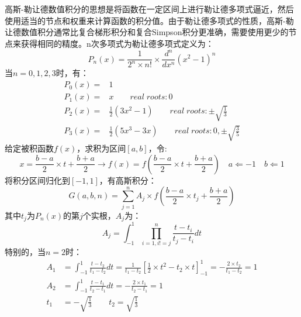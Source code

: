 \documentclass[12pt, onecolumn]{article}
\newcommand\normf{\fangsong}
\begin{document}
	\section{\normf{高斯型求积公式}}
	高斯-勒让德数值积分的思想是将函数在一定区间上进行勒让德多项式逼近，然后使用适当的节点和权重来计算函数的积分值。由于勒让德多项式的性质，高斯-勒让德数值积分通常比复合梯形积分和复合Simpson积分更准确，需要使用更少的节点来获得相同的精度。n次多项式为勒让德多项式定义为：
	\begin{equation}
	P_n(x)=\frac{1}{2^n\times n!}\times \frac{d^n}{dx^n}
	(x^2-1)^n
	\end{equation}
	当$n=0,1,2,3$时，有：
	\begin{equation}
	\begin{aligned}
	P_0(x)=&1
	\\
	P_1(x)=&x
	\qquad real\;roots:0
	\\
	P_2(x)=&\frac{1}{2}(3x^2-1)
	\qquad real\;roots:\pm\sqrt{\frac{1}{3}}
	\\
	P_3(x)=&\frac{1}{2}(5x^3-3x)
	\qquad real\;roots:0,\pm\sqrt{\frac{3}{5}}
	\end{aligned}
	\end{equation}
	给定被积函数$f(x)$，求积为区间$[a,b]$，令:
	\begin{equation}
	x=\frac{b-a}{2}\times t+\frac{b+a}{2}
	\rightarrow
	f(x)=f\left( \frac{b-a}{2}\times t+\frac{b+a}{2}\right) 
	\quad
	a\Leftarrow -1\quad b\Leftarrow 1
	\end{equation}
	将积分区间归化到$[-1,1]$，有高斯积分：
	\begin{equation}
	G(a,b,n)=\sum_{j=1}^{n}A_j\times 
	f\left( 
	\frac{b-a}{2}\times t_j+\frac{b+a}{2}
	\right) 
	\end{equation}
	其中$t_j$为$P_n(x)$的第$j$个实根，$A_j$为：
	\begin{equation}
	A_j=\int_{-1}^{1}\prod_{i=1,i!=j}^{n}\frac{t-t_i}{t_j-t_i}dt
	\end{equation}
	特别的，当$n=2$时：
	\begin{equation}
	\begin{aligned}
	A_1&=\int_{-1}^{1}\frac{t-t_2}{t_1-t_2}dt=\frac{1}{t_1-t_2}\left[
		\frac{1}{2}\times t^2-t_2\times t
		\right]_{-1}^{1}=-\frac{2\times t_2}{t_1-t_2}=1
		\\
		A_2&=\int_{-1}^{1}\frac{t-t_1}{t_2-t_1}dt=-\frac{2\times t_1}{t_2-t_1}=1
		\\
		t_1&=-\sqrt{\frac{1}{3}}\qquad t_2=\sqrt{\frac{1}{3}}
	\end{aligned}
	\end{equation}
\end{document}
